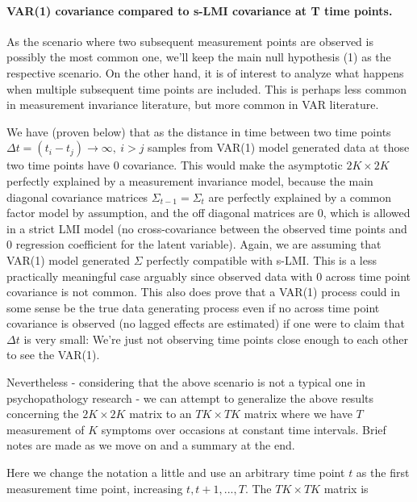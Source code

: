 \documentclass[
  letterpaper,
  DIV=11,
  numbers=noendperiod]{scrartcl}
\let\oldparagraph\paragraph
\renewcommand{\paragraph}[1]{\oldparagraph{#1}\mbox{}}
\begin{document}
\hypertarget{var1-covariance-compared-to-s-lmi-covariance-at-t-time-points.}{%
\paragraph{VAR(1) covariance compared to s-LMI covariance at T time
points.}\label{var1-covariance-compared-to-s-lmi-covariance-at-t-time-points.}}

As the scenario where two subsequent measurement points are observed is
possibly the most common one, we'll keep the main null hypothesis (1) as
the respective scenario. On the other hand, it is of interest to analyze
what happens when multiple subsequent time points are included. This is
perhaps less common in measurement invariance literature, but more
common in VAR literature.

We have (proven below) that as the distance in time between two time
points \(\Delta t=(t_i-t_j)\to\infty, \:i>j\) samples from VAR(1) model
generated data at those two time points have 0 covariance. This would
make the asymptotic \(2K\times2K\) perfectly explained by a measurement
invariance model, because the main diagonal covariance matrices
\(\Sigma_{t-1}=\Sigma_t\) are perfectly explained by a common factor
model by assumption, and the off diagonal matrices are 0, which is
allowed in a strict LMI model (no cross-covariance between the observed
time points and 0 regression coefficient for the latent variable).
Again, we are assuming that VAR(1) model generated \(\Sigma\) perfectly
compatible with s-LMI. This is a less practically meaningful case
arguably since observed data with 0 across time point covariance is not
common. This also does prove that a VAR(1) process could in some sense
be the true data generating process even if no across time point
covariance is observed (no lagged effects are estimated) if one were to
claim that \(\Delta t\) is very small: We're just not observing time
points close enough to each other to see the VAR(1).

Nevertheless - considering that the above scenario is not a typical one
in psychopathology research - we can attempt to generalize the above
results concerning the \(2K\times2K\) matrix to an \(TK\times TK\)
matrix where we have \(T\) measurement of \(K\) symptoms over occasions
at constant time intervals. Brief notes are made as we move on and a
summary at the end.

Here we change the notation a little and use an arbitrary time point
\(t\) as the first measurement time point, increasing
\({t, t+1,...,T}\). The \(TK\times TK\) matrix is
\end{document}
